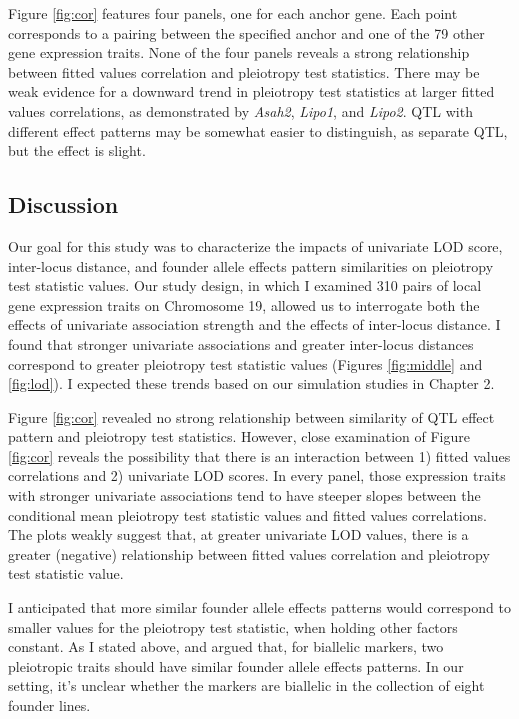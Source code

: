 \documentclass[oneside]{book}\usepackage[]{graphicx}\usepackage[]{color}
\begin{document}
Figure \ref{fig:cor} features four panels, one for each anchor gene. 
Each point corresponds to a pairing between the specified anchor and one of the 79 other gene expression traits. 
None of the four panels reveals a strong relationship between fitted values correlation and pleiotropy test statistics. 
There may be weak evidence for a downward trend in pleiotropy
test statistics at larger fitted values correlations, as 
demonstrated by \emph{Asah2}, \emph{Lipo1}, and \emph{Lipo2}. QTL with different effect patterns may be somewhat easier to distinguish, as separate QTL, but the effect is slight.



\subsection{Discussion}

Our goal for this study was to characterize the impacts of univariate LOD score, 
inter-locus distance, and founder allele effects pattern similarities on pleiotropy test
statistic values. 
Our study design, in which I examined 310 pairs of local gene expression traits on Chromosome
19, allowed us to interrogate both the effects of univariate association strength and the
effects of inter-locus distance. 
I found that stronger univariate associations and greater inter-locus distances
correspond to greater pleiotropy test statistic values (Figures \ref{fig:middle} 
and \ref{fig:lod}). 
I expected these trends based on our simulation studies in Chapter 2.

Figure \ref{fig:cor} revealed no strong relationship between similarity of QTL effect pattern and pleiotropy test statistics. 
However, close examination of Figure \ref{fig:cor} reveals the possibility that there is an interaction between 1) fitted values correlations and 2) univariate LOD scores. 
In every panel, those expression traits with stronger univariate associations
tend to have steeper slopes between the conditional mean pleiotropy
test statistic values and fitted values correlations. 
The plots weakly suggest that, at greater univariate LOD values, 
there is a greater (negative) relationship between fitted values 
correlation and pleiotropy test statistic value.

I anticipated that more similar founder allele effects patterns would correspond to 
smaller values for the pleiotropy test statistic, when holding other factors constant.
As I stated above, \citet{macdonald2007joint} and \citet{king2012genetic} argued that,
for biallelic markers, two pleiotropic traits should have similar founder allele effects patterns. 
In our setting, it's unclear whether the markers are biallelic in the collection of eight founder lines.
\end{document}
